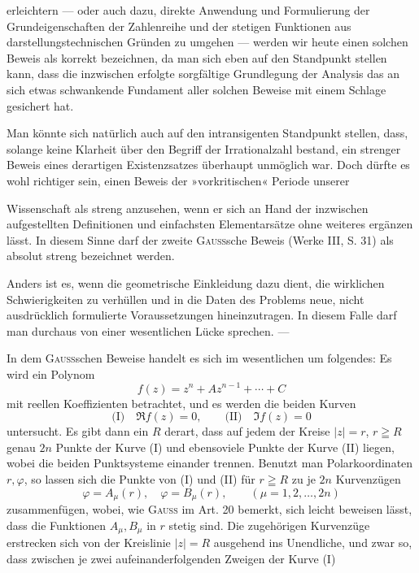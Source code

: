 erleichtern — oder auch dazu, direkte Anwendung und Formulierung der Grundeigenschaften
der Zahlenreihe und der stetigen Funktionen aus darstellungstechnischen
Gründen zu umgehen — werden wir heute einen solchen Beweis
als korrekt bezeichnen, da man sich eben auf den Standpunkt stellen kann,
dass die inzwischen erfolgte sorgfältige Grundlegung der Analysis das an sich
etwas schwankende Fundament aller solchen Beweise mit einem Schlage gesichert
hat.
\par
Man könnte sich natürlich auch auf den intransigenten Standpunkt stellen,
dass, solange keine Klarheit über den Begriff der Irrationalzahl bestand, ein
strenger Beweis eines derartigen Existenzsatzes überhaupt unmöglich war. Doch
dürfte es wohl richtiger sein, einen Beweis der »vorkritischen« Periode unserer\par
\clearpage{}
\noindent Wissenschaft als streng anzusehen, wenn er sich an Hand der inzwischen aufgestellten
Definitionen und einfachsten Elementarsätze ohne weiteres ergänzen
lässt. In diesem Sinne darf der zweite \textsc{Gauss}sche Beweis (Werke III, S. 31)
als absolut streng bezeichnet werden.
\par
Anders ist es, wenn die geometrische Einkleidung dazu dient, die wirklichen
Schwierigkeiten zu verhüllen und in die Daten des Problems neue,
nicht ausdrücklich formulierte Voraussetzungen hineinzutragen. In diesem
Falle darf man durchaus von einer wesentlichen Lücke sprechen. —
\par
In dem \textsc{Gauss}schen Beweise handelt es sich im wesentlichen um folgendes:
Es wird ein Polynom
\[
f(z)=z^n+Az^{n-1}+\cdots+C
\]
mit reellen Koeffizienten betrachtet, und es werden die beiden Kurven
\[
\text{(I)}\quad\Re f(z)=0,\qquad\text{(II)}\quad\Im f(z)=0
\]
untersucht. Es gibt dann ein \(R\) derart, dass auf jedem der Kreise \(|z|=r\),
\(r\geqq R\) genau \(2n\) Punkte der Kurve (I) und ebensoviele Punkte der Kurve (II)
liegen, wobei die beiden Punktsysteme einander trennen. Benutzt man Polarkoordinaten
\(r,\varphi\), so lassen sich die Punkte von (I) und (II) für \(r\geqq R\) zu je
\(2n\) Kurvenzügen
\[
\varphi=A_\mu(r),\quad\varphi=B_\mu(r),\qquad(\mu=1,2,\ldots,2n)
\]
zusammenfügen, wobei, wie \textsc{Gauss} im Art. 20 bemerkt, sich leicht beweisen
lässt, dass die Funktionen \(A_\mu,B_\mu\) in \(r\) stetig sind. Die zugehörigen Kurvenzüge
erstrecken sich von der Kreislinie \(|z|=R\) ausgehend ins Unendliche,
und zwar so, dass zwischen je zwei aufeinanderfolgenden Zweigen der Kurve (I)
